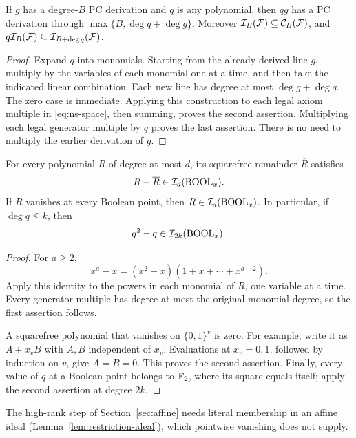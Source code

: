 \begin{lemma}\label{lem:pc-product}
If \(g\) has a degree-\(B\) PC derivation and \(q\) is any polynomial,
then \(qg\) has a PC derivation through
\(\max\{B,\deg q+\deg g\}\).
Moreover \(\mathcal I_B(\mathcal F)\subseteq\mathcal C_B(\mathcal F)\), and
\(q\mathcal I_B(\mathcal F)\subseteq\mathcal I_{B+\deg q}(\mathcal F)\).
\end{lemma}
\begin{proof}
Expand \(q\) into monomials. Starting from the already derived line \(g\),
multiply by the variables of each monomial one at a time, and then take
the indicated linear combination. Each new line has degree at most
\(\deg g+\deg q\). The zero case is immediate.
Applying this construction to each legal axiom multiple in
\eqref{eq:ns-space}, then summing, proves the second assertion.
Multiplying each legal generator multiple by \(q\) proves the last assertion.
There is no need to multiply the earlier derivation of \(g\).
\end{proof}

\begin{lemma}\label{lem:boolean}
For every polynomial \(R\) of degree at most \(d\), its squarefree
remainder \(\overline R\) satisfies
\[
 R-\overline R\in\mathcal I_d(\operatorname{BOOL}_x).
\]
If \(R\) vanishes at every Boolean point, then
\(R\in\mathcal I_d(\operatorname{BOOL}_x)\). In particular, if \(\deg q\le k\), then
\[
 q^2-q\in\mathcal I_{2k}(\operatorname{BOOL}_x).
\]
\end{lemma}
\begin{proof}
For \(a\ge2\),
\[
 x^a-x=(x^2-x)(1+x+\cdots+x^{a-2}).
\]
Apply this identity to the powers in each monomial of \(R\), one variable
at a time. Every generator multiple has degree at most the original
monomial degree, so the first assertion follows.

A squarefree polynomial that vanishes on \(\{0,1\}^v\) is zero.
For example, write it as \(A+x_vB\) with \(A,B\) independent of \(x_v\).
Evaluations at \(x_v=0,1\), followed by induction on \(v\), give \(A=B=0\).
This proves the second assertion. Finally, every value of \(q\) at a
Boolean point belongs to \(\mathbb F_2\), where its square equals itself; apply the
second assertion at degree \(2k\).
\end{proof}

The high-rank step of Section~\ref{sec:affine} needs literal membership in
an affine ideal (Lemma~\ref{lem:restriction-ideal}), which pointwise
vanishing does not supply.

